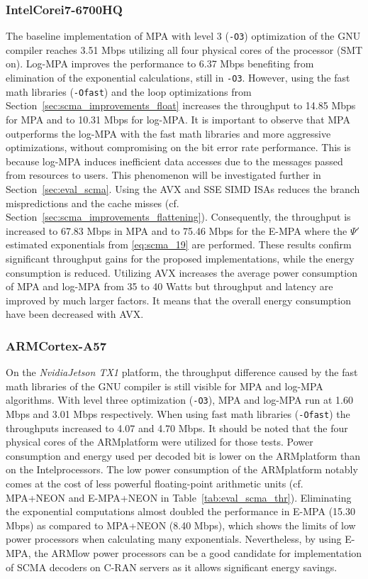 \subsubsection{Intel\R Core\TM i7-6700HQ}

The baseline implementation of MPA with level 3 (\verb|-O3|) optimization of the
GNU compiler reaches 3.51 Mbps utilizing all four physical cores of the
processor (SMT on). Log-MPA improves the performance to 6.37 Mbps benefiting
from elimination of the exponential calculations, still in \verb|-O3|. However,
using the fast math libraries (\verb|-Ofast|) and the loop optimizations from
Section~\ref{sec:scma_improvements_float} increases the throughput to 14.85 Mbps
for MPA and to 10.31 Mbps for log-MPA. It is important to observe that MPA
outperforms the log-MPA with the fast math libraries and more aggressive
optimizations, without compromising on the bit error rate performance. This is
because log-MPA induces inefficient data accesses due to the messages passed
from resources to users. This phenomenon will be investigated further in
Section~\ref{sec:eval_scma}. Using the AVX and SSE SIMD ISAs reduces the
branch mispredictions and the cache misses (cf.
Section~\ref{sec:scma_improvements_flattening}). Consequently, the throughput is
increased to 67.83 Mbps in MPA and to 75.46 Mbps for the E-MPA where the $\Psi'$
estimated exponentials from \eqref{eq:scma_19} are performed. These results
confirm significant throughput gains for the proposed implementations, while the
energy consumption is reduced. Utilizing AVX increases the average power
consumption of MPA and log-MPA from 35 to 40 Watts but throughput and latency
are improved by much larger factors. It means that the overall energy
consumption have been decreased with AVX.

\subsubsection{ARM\R Cortex-A57}

On the \emph{Nvidia\R Jetson TX1} platform, the throughput difference caused by
the fast math libraries of the GNU compiler is still visible for MPA and log-MPA
algorithms. With level three optimization (\verb|-O3|), MPA and log-MPA run at
1.60 Mbps and 3.01 Mbps respectively. When using fast math libraries
(\verb|-Ofast|) the throughputs increased to 4.07 and 4.70 Mbps. It should be
noted that the four physical cores of the ARM\R platform were  utilized for
those tests. Power consumption and energy used per decoded bit is lower on the
ARM\R platform than on the Intel\R processors. The low power consumption of the
ARM\R platform notably comes at the cost of less powerful floating-point
arithmetic units (cf. MPA+NEON and E-MPA+NEON in Table~\ref{tab:eval_scma_thr}).
Eliminating the exponential computations almost doubled the performance in E-MPA
(15.30 Mbps) as compared to MPA+NEON (8.40 Mbps), which shows the limits of low
power processors when calculating many exponentials. Nevertheless, by using
E-MPA, the ARM\R low power processors can be a good candidate for implementation
of SCMA decoders on C-RAN servers as it allows significant energy savings.

